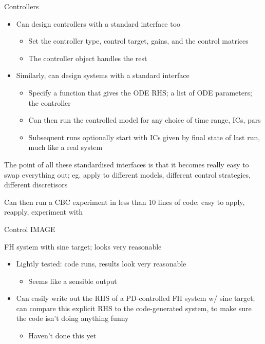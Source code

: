 \documentclass[presentation]{beamer}
\begin{document}
\begin{frame}[plain,label={sec:org0030b1b}]{Controllers}
\begin{itemize}
\item Can design controllers with a standard interface too
\begin{itemize}
\item Set the controller type, control target, gains, and the control matrices
\item The controller object handles the rest
\end{itemize}

\item Similarly, can design systems with a standard interface
\begin{itemize}
\item Specify a function that gives the ODE RHS; a list of ODE parameters; the controller
\item Can then run the controlled model for any choice of time range, ICs, pars
\item Subsequent runs optionally start with ICs given by final state of last run, much like a real system
\end{itemize}
\end{itemize}

The point of all these standardised interfaces is that it becomes really easy to swap everything out; eg. apply to different models, different control strategies, different discretisors

Can then run a CBC experiment in less than 10 lines of code; easy to apply, reapply, experiment with
\end{frame}

\begin{frame}[plain,label={sec:org30ead4c}]{Control}
IMAGE

FH system with sine target; looks very reasonable

\begin{itemize}
\item Lightly tested: code runs, results look very reasonable
\begin{itemize}
\item Seems like a sensible output
\end{itemize}
\item Can easily write out the RHS of a PD-controlled FH system w/ sine target; can compare this explicit RHS to the code-generated system, to make sure the code isn't doing anything funny
\begin{itemize}
\item Haven't done this yet
\end{itemize}
\end{itemize}
\end{frame}
\end{document}
